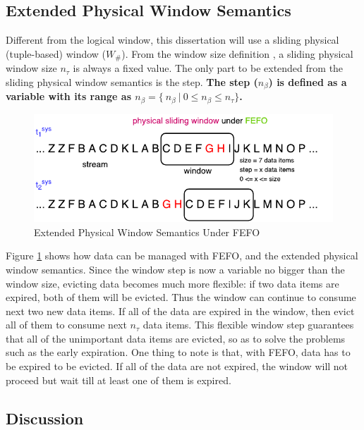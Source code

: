 \subsection{Extended Physical Window Semantics}
Different from the logical window, this dissertation will use a sliding physical (tuple-based) window ($W_{\#}$).
From the window size definition \cite{tangwongsan2015general}, a sliding physical window size $n_{\tau}$ is always a fixed value.
The only part to be extended from the sliding physical window semantics is the step. 
\textbf{The step ($n_{\beta}$) is defined as a variable with its range as ${n_{\beta} = \{\ n_{\beta} \ |\ 0 \leq n_{\beta} \leq n_{\tau}}\}$.}

\begin{figure}[!htbp]
	\centering
    \includegraphics[width=5in]{img/3-psewstu.pdf}
    \caption{Extended Physical Window Semantics Under FEFO}
    \label{fig:3-psewstu}
\end{figure}

Figure \ref{fig:3-psewstu} shows how data can be managed with FEFO, and the extended physical window semantics. 
Since the window step is now a variable no bigger than the window size, evicting data becomes much more flexible: if two data items are expired, both of them will be evicted. 
Thus the window can continue to consume next two new data items. 
If all of the data are expired in the window, then evict all of them to consume next $n_{\tau}$ data items. 
This flexible window step guarantees that all of the unimportant data items are evicted, so as to solve the problems such as the early expiration. 
One thing to note is that, with FEFO, data has to be expired to be evicted.
If all of the data are not expired, the window will not proceed but wait till at least one of them is expired. 
%
\subsection{Discussion}

